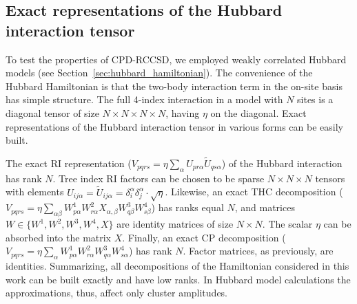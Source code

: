 \subsection{Exact representations of the Hubbard interaction tensor}
To test the properties of CPD-RCCSD, we employed weakly correlated 
Hubbard models (see Section~\ref{sec:hubbard_hamiltonian}). 
The convenience of the Hubbard Hamiltonian is that the two-body interaction term 
in the on-site basis has simple structure. The full 4-index interaction in a 
model with $N$ sites is a diagonal tensor of size $N\times N\times N \times N$, 
having $\eta$ on the diagonal. Exact representations of the Hubbard interaction 
tensor in various forms can be easily built.

The exact RI representation ($V_{pqrs} = 
\eta \sum_{\alpha} U_{pr\alpha} \tilde{U}_{qs\alpha}$) of the Hubbard 
interaction has rank $N$. Tree index RI factors can be chosen to be sparse $N 
\times N \times N$ tensors with elements $U_{ij\alpha} = \tilde{U}_{ij\alpha} 
= \delta_{i}^{\alpha} \delta_{j}^{\alpha} \cdot \sqrt{\eta}$. Likewise, an 
exact THC decomposition ($V_{pqrs} = \eta \sum_{\alpha \beta} W^{1}_{p\alpha} 
W^{2}_{r\alpha} X_{\alpha, \beta} W^{3}_{q\beta} W^{4}_{s\beta}$) has ranks 
equal $N$, and matrices $W \in \{W^{1}, W^{2}, W^{3}, W^{4}, X\}$ are identity 
matrices of size $N \times N$. The scalar $\eta$ can be absorbed into the 
matrix $X$. Finally, an exact CP decomposition ($V_{pqrs} = \eta \sum_{\alpha} 
W^{1}_{p\alpha} W^{2}_{r\alpha} W^{3}_{q\alpha} W^{4}_{s\alpha}$) has rank $N$.
Factor matrices, as previously, are identities. Summarizing, all decompositions 
of the Hamiltonian considered in this work can be built exactly and have low 
ranks. In Hubbard model calculations the approximations, thus, affect only 
cluster amplitudes.

